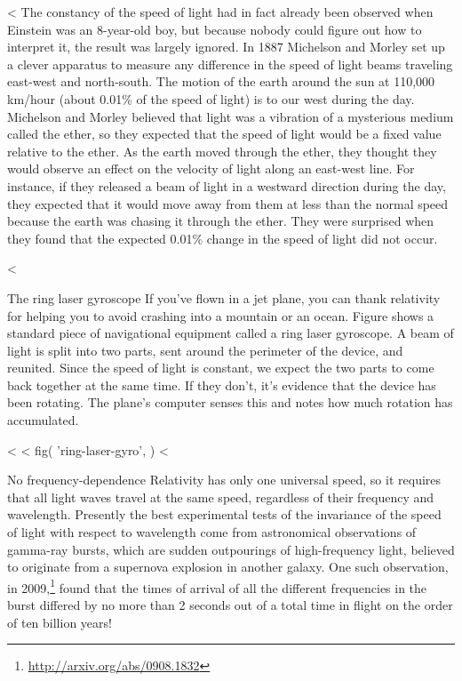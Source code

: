 <%
The constancy of the speed of light had in fact already been
observed when Einstein was an 8-year-old boy, but because nobody could
figure out how to interpret it, the result was largely ignored.
In 1887 Michelson and Morley set up a clever apparatus to
measure any difference in the speed of light beams traveling
east-west and north-south. The motion of the earth around
the sun at 110,000 km/hour (about 0.01\% of the speed of
light) is to our west during the day. Michelson and Morley
believed that light was a vibration of a mysterious medium called the ether, so they expected that the
speed of light would be a fixed value relative to the ether.
As the earth moved through the ether, they thought they
would observe an effect on the velocity of light along an
east-west line. For instance, if they released a beam of
light in a westward direction during the day, they expected
that it would move away from them at less than the normal
speed because the earth was chasing it through the ether.
They were surprised when they found that the expected 0.01\%
change in the speed of light did not occur.

<%

\begin{eg}{The ring laser gyroscope}
If you've flown in a jet plane, you can thank relativity for helping you to avoid
crashing into a mountain or an ocean. Figure  shows a standard
piece of navigational equipment called a ring laser gyroscope. A beam of light is
split into two parts, sent around the perimeter of the device, and reunited. Since
the speed of light is constant, we expect the two parts to come back together at the
same time. If they don't, it's evidence that the device has been rotating. The plane's
computer senses this and notes how much rotation has accumulated.
\end{eg}
<%
<%
  fig(
    'ring-laser-gyro',
  )
<%

\begin{eg}{No frequency-dependence}
Relativity has only one universal speed, so it requires that all light waves
travel at the same speed, regardless of their frequency and wavelength.
Presently the best experimental tests of the invariance of
the speed of light with respect to wavelength come from astronomical observations of
gamma-ray bursts, which are sudden
outpourings of high-frequency light, believed to originate from a supernova explosion
in another galaxy. One such observation,
in 2009,\footnote{\url{http://arxiv.org/abs/0908.1832}} 
found that the
times of arrival of all the different frequencies in the burst
differed by no more than 2 seconds out of a total time in flight on the order
of ten billion years!
\end{eg}

